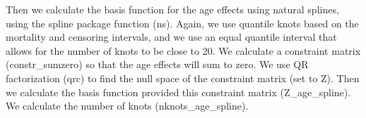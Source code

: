 \documentclass[11pt,]{article}
\newenvironment{Shaded}{\begin{snugshade}}{\end{snugshade}}
\newcommand{\KeywordTok}[1]{\textcolor[rgb]{0.13,0.29,0.53}{\textbf{#1}}}
\newcommand{\DataTypeTok}[1]{\textcolor[rgb]{0.13,0.29,0.53}{#1}}
\newcommand{\DecValTok}[1]{\textcolor[rgb]{0.00,0.00,0.81}{#1}}
\newcommand{\StringTok}[1]{\textcolor[rgb]{0.31,0.60,0.02}{#1}}
\newcommand{\OtherTok}[1]{\textcolor[rgb]{0.56,0.35,0.01}{#1}}
\newcommand{\OperatorTok}[1]{\textcolor[rgb]{0.81,0.36,0.00}{\textbf{#1}}}
\newcommand{\NormalTok}[1]{#1}
\begin{document}
Then we calculate the basis function for the age effects using natural
splines, using the spline package function (ns). Again, we use quantile
knots based on the mortality and censoring intervals, and we use an
equal quantile interval that allows for the number of knots to be close
to 20. We calculate a constraint matrix (constr\_sumzero) so that the
age effects will sum to zero. We use QR factorization (qrc) to find the
null space of the constraint matrix (set to Z). Then we calculate the
basis function provided this constraint matrix (Z\_age\_spline). We
calculate the number of knots (nknots\_age\_spline).

\begin{Shaded}
\end{Shaded}
\end{document}
